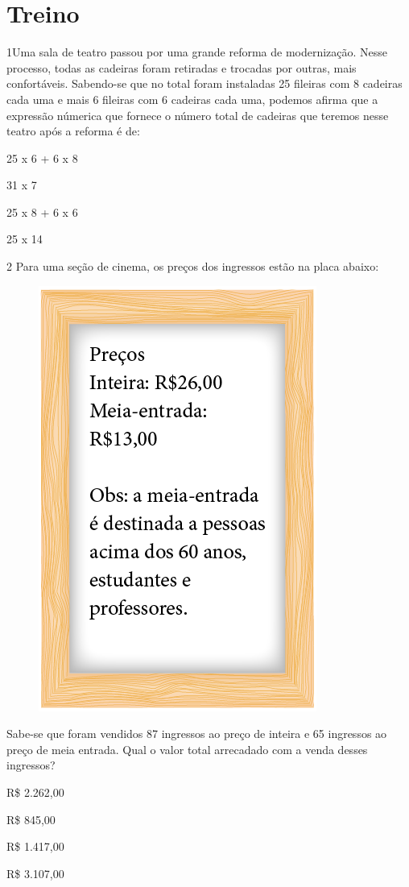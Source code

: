 \pagebreak
\section*{Treino}

\num{1}Uma sala de teatro passou por uma grande reforma de modernização.
Nesse processo, todas as cadeiras foram retiradas e trocadas por outras,
mais confortáveis. Sabendo-se que no total foram instaladas 25 fileiras
com 8 cadeiras cada uma e mais 6 fileiras com 6 cadeiras cada uma,
podemos afirma que a expressão númerica que fornece o número total de
cadeiras que teremos nesse teatro após a reforma é de:

\begin{multicols}{2}
\begin{escolha}
\item
  25 x 6 + 6 x 8
\item
  31 x 7
\item
  25 x 8 + 6 x 6
\item
  25 x 14
\end{escolha}
\end{multicols}



\num{2} Para uma seção de cinema, os preços dos ingressos estão na placa
abaixo:

\begin{figure}[htpb!]
\centering
\includegraphics[width=.4\textwidth]{../ilustracoes/MAT5/SAEB_5ANO_MAT_figura93.png}
\end{figure}

Sabe-se que foram vendidos 87 ingressos ao preço de inteira e 65
ingressos ao preço de meia entrada. Qual o valor total arrecadado com a
venda desses ingressos?

\begin{multicols}{2}
\begin{escolha}
\item
  R\$ 2.262,00
\item
  R\$ 845,00
\item
  R\$ 1.417,00
\item
  R\$ 3.107,00
\end{escolha}
\end{multicols}


